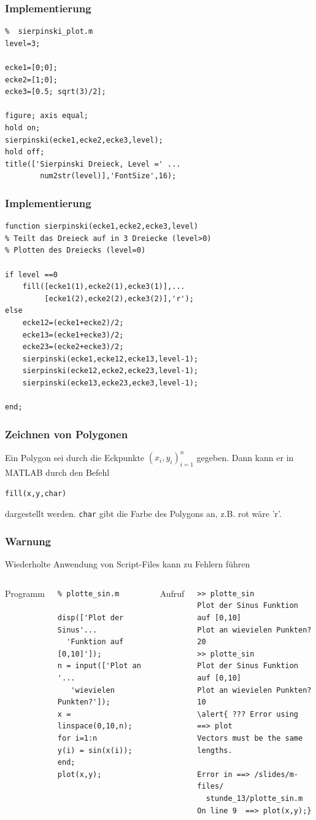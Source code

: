 %
%
\begin{frame}[fragile]\frametitle{Implementierung}
\begin{lstlisting}
%  sierpinski_plot.m
level=3;

ecke1=[0;0];
ecke2=[1;0];
ecke3=[0.5; sqrt(3)/2];

figure; axis equal;
hold on;
sierpinski(ecke1,ecke2,ecke3,level);
hold off;
title(['Sierpinski Dreieck, Level =' ...
        num2str(level)],'FontSize',16);
\end{lstlisting}
\end{frame}
%
%
\begin{frame}[fragile]\frametitle{Implementierung}
\begin{lstlisting}
function sierpinski(ecke1,ecke2,ecke3,level)
% Teilt das Dreieck auf in 3 Dreiecke (level>0)
% Plotten des Dreiecks (level=0)

if level ==0 
    fill([ecke1(1),ecke2(1),ecke3(1)],...
         [ecke1(2),ecke2(2),ecke3(2)],'r');
else
    ecke12=(ecke1+ecke2)/2;
    ecke13=(ecke1+ecke3)/2;
    ecke23=(ecke2+ecke3)/2;
    sierpinski(ecke1,ecke12,ecke13,level-1);
    sierpinski(ecke12,ecke2,ecke23,level-1);
    sierpinski(ecke13,ecke23,ecke3,level-1);
    
end;
\end{lstlisting}
\end{frame}
% 
% 
\begin{frame}[fragile]\frametitle{Zeichnen von Polygonen}

Ein Polygon sei durch die Eckpunkte $(x_i,y_i)_{i=1}^n$ gegeben. Dann
kann er in MATLAB durch den Befehl
\begin{lstlisting}
fill(x,y,char)
\end{lstlisting}
dargestellt werden. \lstinline!char! gibt die Farbe des Polygons an, z.B. rot
wäre 'r'.
\end{frame}
%
%
\begin{frame}[fragile]\frametitle{Warnung}
\begin{center}
\alert{ Wiederholte Anwendung von Script-Files kann zu Fehlern führen}\\[0.7cm]
\end{center}
\begin{columns}[t]
\alert{Programm}
\begin{lstlisting}
% plotte_sin.m

disp(['Plot der Sinus'...
  'Funktion auf [0,10]']);
n = input(['Plot an '...
   'wievielen Punkten?']);
x = linspace(0,10,n);
for i=1:n
y(i) = sin(x(i));
end; 
plot(x,y);
\end{lstlisting}
\alert{ Aufruf}
\begin{lstlisting}
>> plotte_sin
Plot der Sinus Funktion auf [0,10]
Plot an wievielen Punkten?20
>> plotte_sin
Plot der Sinus Funktion auf [0,10]
Plot an wievielen Punkten?10
\alert{ ??? Error using ==> plot
Vectors must be the same lengths.

Error in ==> /slides/m-files/
  stunde_13/plotte_sin.m
On line 9  ==> plot(x,y);}
\end{lstlisting}
\end{columns}
\end{frame}
